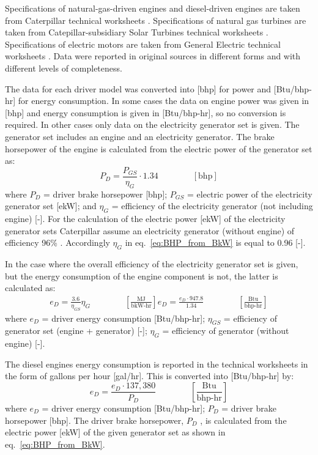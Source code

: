 \documentclass[11pt]{report}
\newcommand{\eqnunit}[1]{\quad\quad \scriptstyle{\left[\text{#1}\right]}}
\newcommand{\eqnunitfrac}[2]{\quad\quad \scriptstyle{\left[\frac{\text{#1}}{\text{#2}}\right]}}
\begin{document}
Specifications of natural-gas-driven engines and diesel-driven engines are taken from Caterpillar technical worksheets \cite{Caterpillar2012}. Specifications of natural gas turbines are taken from Catepillar-subsidiary Solar Turbines technical worksheets \cite{Solarturbines2012}. Specifications of electric motors are taken from General Electric technical worksheets \cite{GE2011}. Data were reported in original sources in different forms and with different levels of completeness.

The data for each driver model was converted into [bhp] for power and [Btu/bhp-hr] for energy consumption. In some cases the data on engine power was given in [bhp] and energy consumption is given in [Btu/bhp-hr], so no conversion is required. In other cases only data on the electricity generator set is given. The generator set includes an engine and an electricity generator. The brake horsepower of the engine is calculated from the electric power of the generator set as:
\begin{equation}\label{eq:BHP_from_BkW}
P_{D}= \frac{P_{GS}}{\eta_{G}} \cdot 1.34 \quad\quad\eqnunit{bhp}
\end{equation}
where $P_{D}$ = driver brake horsepower [bhp]; $P_{GS}$ = electric power of the electricity generator set [ekW]; and $\eta_{G}$ = efficiency of the electricity generator (not including engine) [-]. For the calculation of the electric power [ekW] of the electricity generator sets Caterpillar assume an electricity generator (without engine) of efficiency 96\% \cite[p. 4]{Caterpillar2012b}. Accordingly $\eta_{G}$ in eq.\ \eqref{eq:BHP_from_BkW} is equal to 0.96 [-].


In the case where the overall efficiency of the electricity generator set is given, but the energy consumption of the engine component is not, the latter is calculated as:
\begin{equation} \label{eq:calc_EC_eff}
\begin{split}
 e_{D} = \frac{3.6}{\eta_{GS}} \eta_{G} \quad\quad\eqnunitfrac{MJ}{bkW-hr}
 e_{D} = \frac{e_{D} \cdot 947.8}{1.34} \quad\quad\eqnunitfrac{Btu}{bhp-hr}
\end{split}
\end{equation}
where $e_{D}$ = driver energy consumption [Btu/bhp-hr]; $\eta_{GS}$ = efficiency of generator set (engine + generator) [-]; $\eta_{G}$ = efficiency of generator (without engine) [-].

The diesel engines energy consumption is reported in the technical worksheets in the form of gallons per hour [gal/hr]. This is converted into [Btu/bhp-hr] by:
\begin{equation} \label{eq:diesel_engine_EC_unit_conversion}
e_{D} = \frac{e_{D} \cdot137,380 }{P_{D}} \quad\quad\eqnunitfrac{Btu}{bhp-hr}
\end{equation}
where $e_{D}$ = driver energy consumption [Btu/bhp-hr]; $P_{D}$ = driver brake horsepower [bhp]. The driver brake horsepower, $P_{D}$ , is calculated from the electric power [ekW] of the given generator set as shown in eq.\ \eqref{eq:BHP_from_BkW}.
\end{document}
